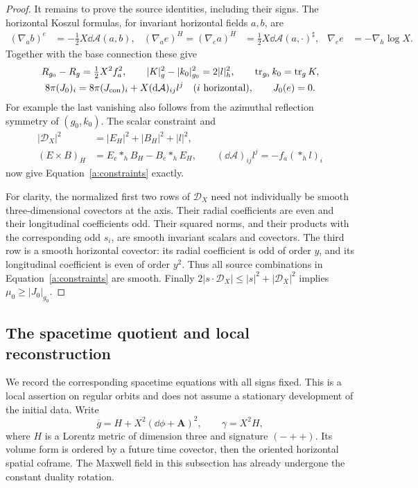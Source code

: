 \begin{proof}
It remains to prove the source identities, including their signs.
The horizontal Koszul formulas, for invariant horizontal fields
$a,b$, are
\begin{align*}
 (\nabla_a b)^e&=-\tfrac12X\dd\mathcal A(a,b),&
 (\nabla_a e)^H=(\nabla_e a)^H
       &=\tfrac12X\dd\mathcal A(a,\cdot)^\sharp,&
 \nabla_e e&=-\nabla_h\log X.
\end{align*}
Together with the base connection these give
\begin{equation}\label{a:deletion-identities}
 \begin{gathered}
 R_{g_0}-R_g=\tfrac12X^2f_a^2,\qquad
 |K|_g^2-|k_0|_{g_0}^2=2|l|_h^2,\qquad
 \operatorname{tr}_{g_0}k_0=\operatorname{tr}_gK,\\
 8\pi(J_0)_i=8\pi(J_{\rm con})_i
                       +X(\mathrm d\mathcal A)_{ij}l^j
                       \quad(i\text{ horizontal}),\qquad
 J_0(e)=0.
 \end{gathered}
\end{equation}
For example the last vanishing also follows from the azimuthal
reflection symmetry of $(g_0,k_0)$.  The scalar constraint and
\begin{align*}
 |\mathcal D_X|^2&=|E_H|^2+|B_H|^2+|l|^2,\\
 (E\times B)_H&=E_e*_hB_H-B_e*_hE_H,\qquad
 (\dd\mathcal A)_{ij}l^j=-f_a(*_hl)_i
\end{align*}
now give Equation~\eqref{a:constraints} exactly.

For clarity, the normalized first two rows of $\mathcal D_X$
need not individually be smooth three-dimensional covectors at
the axis.  Their radial coefficients are even and their
longitudinal coefficients odd.  Their squared norms, and their
products with the corresponding odd $s_i$, are smooth invariant
scalars and covectors.  The third row is a smooth horizontal
covector: its radial coefficient is odd of order $y$, and its
longitudinal coefficient is even of order $y^2$.  Thus all source
combinations in Equation~\eqref{a:constraints} are smooth.
Finally $2|s\cdot\mathcal D_X|\le |s|^2+|\mathcal D_X|^2$
implies $\mu_0\ge|J_0|_{g_0}$.
\end{proof}

\subsection{The spacetime quotient and local reconstruction}

We record the corresponding spacetime equations with all signs
fixed.  This is a local assertion on regular orbits and does not
assume a stationary development of the initial data.  Write
\[
 \overline g=H+X^2(\dd\phi+\mathbf A)^2,
 \qquad \gamma=X^2H,
\]
where $H$ is a Lorentz metric of dimension three and signature
$(-++)$.  Its volume form is ordered by a future time covector,
then the oriented horizontal spatial coframe.  The Maxwell field
in this subsection has already undergone the constant duality
rotation.

